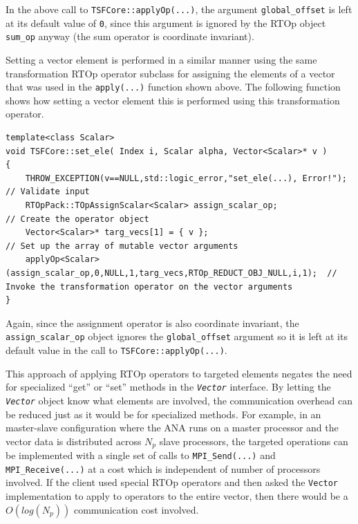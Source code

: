 \documentclass[10pt,fleqn]{article}
\begin{document}
In the above call to \texttt{TSFCore::applyOp(...)}, the argument
\texttt{global\_offset} is left at its default value of \texttt{0},
since this argument is ignored by the RTOp object \texttt{sum\_op}
anyway (the sum operator is coordinate invariant).

Setting a vector element is performed in a similar manner using the
same transformation RTOp operator subclass for assigning the elements
of a vector that was used in the \texttt{apply(...)} function shown
above.  The following function shows how setting a vector element this
is performed using this transformation operator.

{\scriptsize\begin{verbatim}
template<class Scalar>
void TSFCore::set_ele( Index i, Scalar alpha, Vector<Scalar>* v )
{
    THROW_EXCEPTION(v==NULL,std::logic_error,"set_ele(...), Error!");               // Validate input
    RTOpPack::TOpAssignScalar<Scalar> assign_scalar_op;                             // Create the operator object
    Vector<Scalar>* targ_vecs[1] = { v };                                           // Set up the array of mutable vector arguments
    applyOp<Scalar>(assign_scalar_op,0,NULL,1,targ_vecs,RTOp_REDUCT_OBJ_NULL,i,1);  // Invoke the transformation operator on the vector arguments
}
\end{verbatim}}

Again, since the assignment operator is also coordinate invariant, the
\texttt{assign\_scalar\_op} object ignores the \texttt{global\_offset}
argument so it is left at its default value in the call to
\texttt{TSFCore::applyOp(...)}.

This approach of applying RTOp operators to targeted elements negates
the need for specialized ``get'' or ``set'' methods in the
\texttt{\textit{Vector}} interface.  By letting the \texttt{\textit{Vector}}
object know what elements are involved, the communication overhead can
be reduced just as it would be for specialized methods.  For example,
in an master-slave configuration where the ANA runs on a master
processor and the vector data is distributed across $N_p$ slave
processors, the targeted operations can be implemented with a single
set of calls to \texttt{MPI\_Send(...)} and
\texttt{MPI\_Receive(...)} at a cost which is independent of number of
processors involved.  If the client used special RTOp operators and
then asked the \texttt{\texttt{Vector}} implementation to apply to
operators to the entire vector, then there would be a $O(log(N_p))$
communication cost involved.
\end{document}
